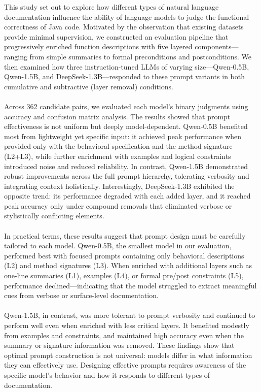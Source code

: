 \documentclass[a4paper]{usiinfbachelorproject}
\begin{document}
This study set out to explore how different types of natural language documentation influence the ability of language models to judge the functional correctness of Java code. Motivated by the observation that existing datasets provide minimal supervision, we constructed an evaluation pipeline that progressively enriched function descriptions with five layered components—ranging from simple summaries to formal preconditions and postconditions. We then examined how three instruction-tuned LLMs of varying size—Qwen-0.5B, Qwen-1.5B, and DeepSeek-1.3B—responded to these prompt variants in both cumulative and subtractive (layer removal) conditions. \\
\\
Across 362 candidate pairs, we evaluated each model's binary judgments using accuracy and confusion matrix analysis. The results showed that prompt effectiveness is not uniform but deeply model-dependent. Qwen-0.5B benefited most from lightweight yet specific input: it achieved peak performance when provided only with the behavioral specification and the method signature (L2+L3), while further enrichment with examples and logical constraints introduced noise and reduced reliability. In contrast, Qwen-1.5B demonstrated robust improvements across the full prompt hierarchy, tolerating verbosity and integrating context holistically. Interestingly, DeepSeek-1.3B exhibited the opposite trend: its performance degraded with each added layer, and it reached peak accuracy only under compound removals that eliminated verbose or stylistically conflicting elements. \\
\\
In practical terms, these results suggest that prompt design must be carefully tailored to each model. Qwen-0.5B, the smallest model in our evaluation, performed best with focused prompts containing only behavioral descriptions (L2) and method signatures (L3). When enriched with additional layers such as one-line summaries (L1), examples (L4), or formal pre/post constraints (L5), performance declined—indicating that the model struggled to extract meaningful cues from verbose or surface-level documentation.\\
\\
Qwen-1.5B, in contrast, was more tolerant to prompt verbosity and continued to perform well even when enriched with less critical layers. It benefited modestly from examples and constraints, and maintained high accuracy even when the summary or signature information was removed. These findings show that optimal prompt construction is not universal: models differ in what information they can effectively use. Designing effective prompts requires awareness of the specific model's behavior and how it responds to different types of documentation.
\end{document}
